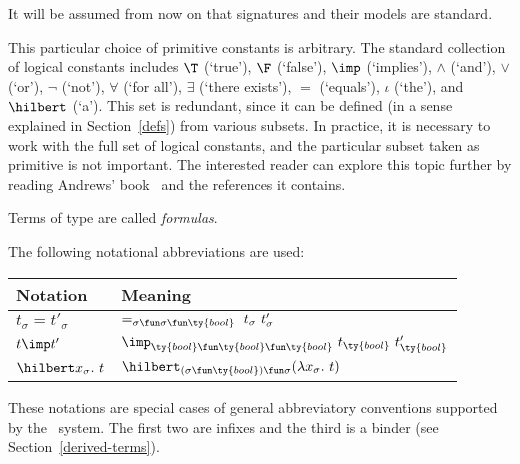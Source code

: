 It will be assumed from now on that signatures and their models are
standard. 
         
\medskip

This particular choice of primitive constants is arbitrary.  The
standard collection of logical constants includes $\T$ (`true'), $\F$ 
(`false'), $\imp$ (`implies'), $\wedge$ (`and'), $\vee$
(`or'), $\neg$ (`not'), $\forall$ (`for all'), $\exists$ (`there
exists'), $=$ (`equals'), $\iota$ (`the'), and $\hilbert$ (`a'). This
set is redundant, since it can be defined (in a sense explained in
Section~\ref{defs}) from various subsets. In practice, it is
necessary to work with the full set of logical constants, and the
particular subset taken as primitive is not important. The interested
reader can explore this topic  further by reading Andrews'
book~\cite{andrews:book} and the references it contains.

\medskip

Terms of type  are  called {\it formulas\/}.

The following notational abbreviations are used:

\begin{center}
\begin{tabular}{|l|l|}\hline
{\rm Notation} & {\rm Meaning}\\ \hline
$t_{\sigma}=t'_{\sigma}$ &
  $=_{\sigma\fun\sigma\fun\ty{bool}}\ t_{\sigma}\ t'_{\sigma}$\\ \hline
$t\imp t'$ &
  $\imp_{\ty{bool}\fun\ty{bool}\fun\ty{bool}}\ t_\ty{bool}\
t'_\ty{bool}$\\ \hline 
$\hilbert x_{\sigma}.\ t$ &
  $ \hilbert_{(\sigma\fun\ty{bool})\fun\sigma}
(\lambda x_{\sigma}.\ t)$\\ \hline
\end{tabular}
\end{center}
These notations are special cases of general abbreviatory 
conventions supported by the \HOL\ system. The first two are infixes 
and the third is a binder (see Section~\ref{derived-terms}).
